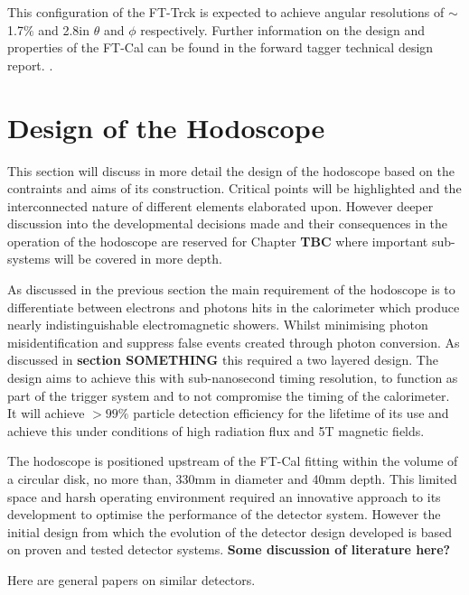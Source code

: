 This configuration of the FT-Trck is expected to achieve angular resolutions of $\sim$ 1.7$\%$ and 2.8\textdegree in $\theta$ and $\phi$ respectively.
Further information on the design and properties of the FT-Cal can be found in the forward tagger technical design report. \cite{FTTDR2012}.



\section{Design of the Hodoscope}

This section will discuss in more detail the design of the hodoscope based on the contraints and aims of its construction. Critical points will be highlighted and the interconnected nature of different elements elaborated upon. However deeper discussion into the developmental decisions made and their consequences in the operation of the hodoscope are reserved for Chapter \textbf{TBC} where important sub-systems will be covered in more depth.

As discussed in the previous section the main requirement of the hodoscope is to differentiate between electrons and photons hits in the calorimeter which produce nearly indistinguishable electromagnetic showers. Whilst minimising photon misidentification and suppress false events created through photon conversion. As discussed in \textbf{section SOMETHING} this required a two layered design. The design aims to achieve this with sub-nanosecond timing resolution, to function as part of the trigger system and to not compromise the timing of the calorimeter. It will achieve $>99\%$ particle detection efficiency for the lifetime of its use and achieve this under conditions of high radiation flux and 5T magnetic fields.


The hodoscope is positioned upstream of the FT-Cal fitting within the volume of a circular disk, no more than, 330mm in diameter and 40mm depth. This limited space and harsh operating environment required an innovative approach to its development to optimise the performance of the detector system. However the initial design from which the evolution of the detector design developed is based on proven and tested detector systems. \textbf{Some discussion of literature here?}


Here are general papers on similar detectors.
\cite{reiche2001studies}
\cite{wojcik1994embedded}
\cite{cohn1993scintillating}
\cite{budd2001cms}
\cite{artikov2006new}
\cite{albrow1987uranium}
\cite{barsuk2000fiber}
\cite{adloff2010construction}

